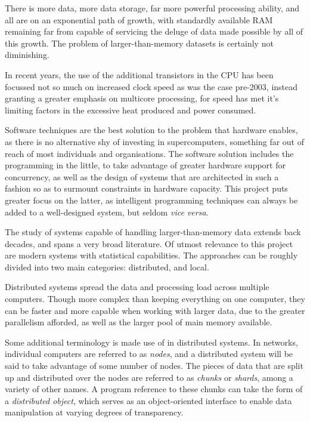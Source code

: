 There is more data, more data storage, far more powerful processing ability, and all are on an exponential path of growth, with standardly available RAM remaining far from capable of servicing the deluge of data made possible by all of this growth\cite{sutter2005free}.
The problem of larger-than-memory datasets is certainly not diminishing.

In recent years, the use of the additional transistors in the CPU has been focussed not so much on increased clock speed as was the case pre-2003, instead granting a greater emphasis on multicore processing, for speed has met it's limiting factors in the excessive heat produced and power consumed\cite{sutter2005free}.

Software techniques are the best solution to the problem that hardware enables, as there is no alternative shy of investing in supercomputers, something far out of reach of most individuals and organisations.
The software solution includes the programming in the little, to take advantage of greater hardware support for concurrency, as well as the design of systems that are architected in such a fashion so as to surmount constraints in hardware capacity.
This project puts greater focus on the latter, as intelligent programming techniques can always be added to a well-designed system, but seldom \textit{vice versa}.

The study of systems capable of handling larger-than-memory data extends back decades, and spans a very broad literature.
Of utmost relevance to this project are modern systems with statistical capabilities.
The approaches can be roughly divided into two main categories: distributed, and local.

Distributed systems spread the data and processing load across multiple computers.
Though more complex than keeping everything on one computer, they can be faster and more capable when working with larger data, due to the greater parallelism afforded, as well as the larger pool of main memory available\cite{foster1995parallel}.

Some additional terminology is made use of in distributed systems.
In networks, individual computers are referred to as \textit{nodes}, and a distributed system will be said to take advantage of some number of nodes\cite{kleppmann2017dataintensive}.
The pieces of data that are split up and distributed over the nodes are referred to as \textit{chunks} or \textit{shards}, among a variety of other names.
A program reference to these chunks can take the form of a \textit{distributed object}, which serves as an object-oriented interface to enable data manipulation at varying degrees of transparency\cite{emmerich2000engineering}.

